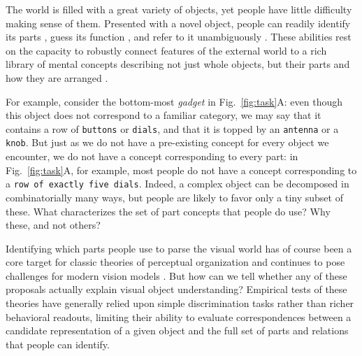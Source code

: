 \documentclass[10pt,letterpaper]{article}
\newcommand{\jda}[1]{{\color{blue}[jda: #1]}}
\begin{document}
\noindent The world is filled with a great variety of objects, yet people have little difficulty making sense of them. 
Presented with a novel object, people can readily identify its parts , guess its function , and refer to it unambiguously . 
These abilities rest on the capacity to robustly connect features of the external world to a rich library of mental concepts describing not just whole objects, but their parts and how they are arranged . 

For example, consider the bottom-most \emph{gadget} in Fig.~\ref{fig:task}A: even though this object does not correspond to a familiar category, we may say that it contains a row of \texttt{buttons} or \texttt{dials}, and that it is topped by an \texttt{antenna} or a \texttt{knob}.
But just as we do not have a pre-existing concept for every object we encounter, we do not have a concept corresponding to every part: in Fig.~\ref{fig:task}A, for example, most people do not have a concept corresponding to a \texttt{row of exactly five dials}.%
Indeed, a complex object can be decomposed in combinatorially many ways, but people are likely to favor only a tiny subset of these.
What characterizes the set of part concepts that people do use? Why these, and not others?

Identifying which parts people use to parse the visual world has of course been a core target for classic theories of perceptual organization  and continues to pose challenges for modern vision models .
But how can we tell whether any of these proposals actually explain visual object understanding? 
Empirical tests of these theories have generally relied upon simple discrimination tasks rather than richer behavioral readouts, limiting their ability to evaluate correspondences between a candidate representation of a given object and the full set of parts and relations that people can identify.
\end{document}
